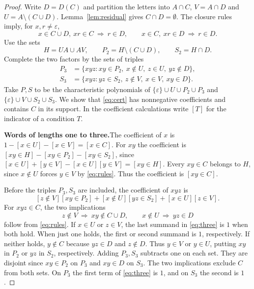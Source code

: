 \documentclass[11pt,a4paper]{article}
\newcommand{\head}[1]{\par\noindent\textbf{#1}\enspace}
\newcommand{\eps}{\varepsilon}
\begin{document}
\begin{proof}
Write $D=D(C)$ and partition the letters into $A\cap C$, $V=A\cap D$ and $U=A\setminus(C\cup D)$.
Lemma~\ref{lem:residual} gives $C\cap D=\emptyset$. The closure rules imply, for $x,r\ne\eps$,
\begin{equation}\label{eq:rules}
  x\in C\cup D,\ xr\in C\ \Longrightarrow\ r\in D,\qquad x\in C,\ xr\in D\ \Longrightarrow\ r\in D.
\end{equation}
Use the sets
\[
  H=UA\cup AV,\qquad P_2=H\setminus(C\cup D),\qquad S_2=H\cap D.
\]
Complete the two factors by the sets of triples
\begin{align*}
  P_3&=\{xyz: xy\in P_2,\ x\notin U,\ z\in U,\ yz\notin D\},\\
  S_3&=\{xyz: yz\in S_2,\ z\notin V,\ x\in V,\ xy\in D\}.
\end{align*}
Take $P,S$ to be the characteristic polynomials of $\{\eps\}\cup U\cup P_2\cup P_3$ and
$\{\eps\}\cup V\cup S_2\cup S_3$. We show that \eqref{eq:cert} has nonnegative coefficients and
contains $C$ in its support. In the coefficient calculations write $[T]$ for the indicator of a
condition $T$.

\head{Words of lengths one to three.}The coefficient of $x$ is $1-[x\in U]-[x\in V]=[x\in C]$. For
$xy$ the coefficient is $[xy\in H]-[xy\in P_2]-[xy\in S_2]$, since
$[x\in U]+[y\in V]-[x\in U][y\in V]=[xy\in H]$. Every $xy\in C$ belongs to $H$, since $x\notin U$
forces $y\in V$ by \eqref{eq:rules}. Thus the coefficient is $[xy\in C]$.

Before the triples $P_3,S_3$ are included, the coefficient of $xyz$ is
\begin{equation}\label{eq:three}
  [z\notin V][xy\in P_2]+[x\notin U][yz\in S_2]+[x\in U][z\in V].
\end{equation}
For $xyz\in C$, the two implications
\[
  z\notin V\ \Longrightarrow\ xy\notin C\cup D,\qquad x\notin U\ \Longrightarrow\ yz\in D
\]
follow from \eqref{eq:rules}. If $x\in U$ or $z\in V$, the last summand in \eqref{eq:three} is $1$
when both hold. When just one holds, the first or second summand is $1$, respectively. If neither
holds, $y\notin C$ because $yz\in D$ and $z\notin D$. Thus $y\in V$ or $y\in U$, putting $xy$ in
$P_2$ or $yz$ in $S_2$, respectively. Adding $P_3,S_3$ subtracts one on each set. They are disjoint
since $xy\in P_2$ on $P_3$ and $xy\in D$ on $S_3$. The two implications exclude $C$ from both sets.
On $P_3$ the first term of \eqref{eq:three} is $1$, and on $S_3$ the second is $1$.


\end{proof}
\end{document}
